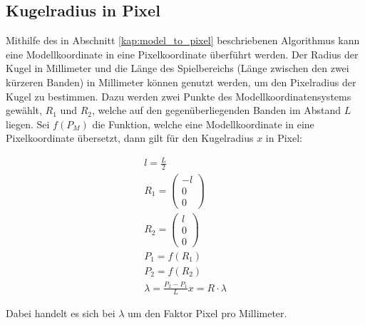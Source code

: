 \subsection{Kugelradius in Pixel}\label{kap:ballradius_in_pixel}

Mithilfe des in Abschnitt \ref{kap:model_to_pixel} beschriebenen Algorithmus kann eine Modellkoordinate
in eine Pixelkoordinate überführt werden.
Der Radius der Kugel in Millimeter und die Länge des Spielbereichs (Länge zwischen den zwei kürzeren Banden) in Millimeter
können genutzt werden, um den Pixelradius der Kugel zu bestimmen.
Dazu werden zwei Punkte des Modellkoordinatensystems gewählt, $R_1$ und $R_2$, welche auf den gegenüberliegenden Banden
im Abstand $L$ liegen.
Sei $f(P_M)$ die Funktion, welche eine Modellkoordinate in eine Pixelkoordinate übersetzt,
dann gilt für den Kugelradius $x$ in Pixel:

\begin{align}
l = \frac{L}{2}\\
R_1 = \begin{pmatrix}-l\\0\\0\end{pmatrix}\\
R_2 = \begin{pmatrix}l\\0\\0\end{pmatrix}\\
P_1 = f(R_1)\\
P_2 = f(R_2)\\
\lambda = \frac{P_2 - P_1}{L}
x = R \cdot \lambda
\end{align}

Dabei handelt es sich bei $\lambda$ um den Faktor Pixel pro Millimeter.
